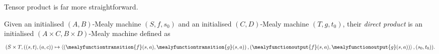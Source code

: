 Tensor product is far more straightforward.

\begin{definition}
    Given an initialised \((A,B)\)-Mealy machine \((S,f,s_0)\) and an
    initialised \((C,D)\)-Mealy machine \((T,g,t_0)\), their
    \emph{direct product} is an initialised \((A \times C,B \times D)\)-Mealy
    machine defined as \[
        (S \times T, \left((s, t), (a, c)\right) \mapsto \left\langle
        \left(
        \mealyfunctiontransition{f}\mleft(s, a\mright),
        \mealyfunctiontransition{g}\mleft(s, a\mright)
        \right),
        \left(
        \mealyfunctionoutput{f}\mleft(s, a\mright),
        \mealyfunctionoutput{g}\mleft(s, a\mright)
        \right)\right\rangle,
        (s_0, t_0)
        ).
    \]
\end{definition}

